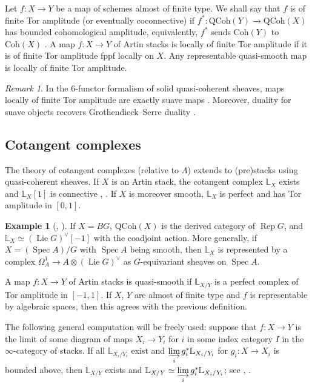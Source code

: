 \documentclass{amsart}
\theoremstyle{definition}
\newtheorem{example}[theorem]{Example}
\theoremstyle{remark}
\newtheorem{remark}[theorem]{Remark}
\numberwithin{equation}{section}
\DeclareMathOperator{\Lie}{Lie}
\DeclareMathOperator{\Spec}{Spec}
\DeclareMathOperator{\Rep}{Rep}
\newcommand{\bb}{\mathbb}
\newcommand{\QCoh}{\mathrm{QCoh}}
\newcommand{\Coh}{\mathrm{Coh}}
\renewcommand{\L}{\mathbb{L}}
\begin{document}
Let $f\colon X\to Y$ be a map of schemes almost of finite type. We shall say that $f$ is of finite Tor amplitude (or eventually coconnective) if $f^*\colon \QCoh(Y)\to \QCoh(X)$ has bounded cohomological amplitude, equivalently, $f^*$ sends $\Coh(Y)$ to $\Coh(X)$ \cite[Lemma 3.6.3]{GaitsgoryIndCohSheaves}. A map $f\colon X\to Y$ of Artin stacks is locally of finite Tor amplitude if it is of finite Tor amplitude fppf locally on $X$. Any representable quasi-smooth map is locally of finite Tor amplitude. 

\begin{remark}
In the 6-functor formalism of solid quasi-coherent sheaves, maps locally of finite Tor amplitude are exactly suave maps \cite[Remark 2.7.13]{HansenMann}. Moreover, duality for suave objects recovers Grothendieck--Serre duality \cite[Corollary 2.8.4]{HansenMann}.   
\end{remark}

\subsection{Cotangent complexes}
The theory of cotangent complexes (relative to $\Lambda$) extends to (pre)stacks \cite[\S 3.2]{LurieThesis} using quasi-coherent sheaves. If $X$ is an Artin stack, the cotangent complex $\bb L_X$ exists and $\bb L_X[1]$ is connective \cite[Proposition 5.1.5]{LurieThesis}, \cite[Proposition 2.4.8]{HansenMann}. If $X$ is moreover smooth, $\bb L_X$ is perfect and has Tor amplitude in $[0,1]$.

\begin{example}[{\cite[Example 2.1.10]{Chenequivariant}, \cite[Proposition 2.4.13]{HansenMann}}]{\label{ex: cotangentcomplexes}}
If $X=BG$, $\QCoh(X)$ is the derived category of $\Rep G$, and $\bb L_X\simeq (\Lie G)^{\vee}[-1]$ with the coadjoint action. More generally, if $X=(\Spec A) /G$ with $\Spec A$ being smooth, then $\bb L_{X}$ is represented by a complex $\Omega^1_A\to A\otimes (\Lie G)^{\vee}$ as $G$-equivariant sheaves on $\Spec A$. 
\end{example}

A map $f\colon X\to Y$ of Artin stacks is quasi-smooth if $\bb L_{X/Y}$ is a perfect complex of Tor amplitude in $[-1, 1]$. If $X$, $Y$ are almost of finite type and $f$ is representable by algebraic spaces, then this agrees with the previous definition. 

The following general computation will be freely used: suppose that $f\colon X \to Y$ is the limit of some diagram of maps $X_i \rightarrow Y_i$ for $i$ in some index category $I$ in the $\infty$-category of stacks. If all $\L_{X_i/Y_i}$ exist and $\varinjlim\limits_i g_i^*\L_{X_i/Y_i}$ for $g_i\colon X\to X_i$ is bounded above, then $\L_{X/Y}$ exists and 
$\L_{X/Y} \simeq \varinjlim\limits_i g_i^*\L_{X_i/Y_i}$;
see \cite[Proposition 3.2.9]{LurieThesis}, \cite[Proposition 2.4.8]{HansenMann}.
\end{document}
